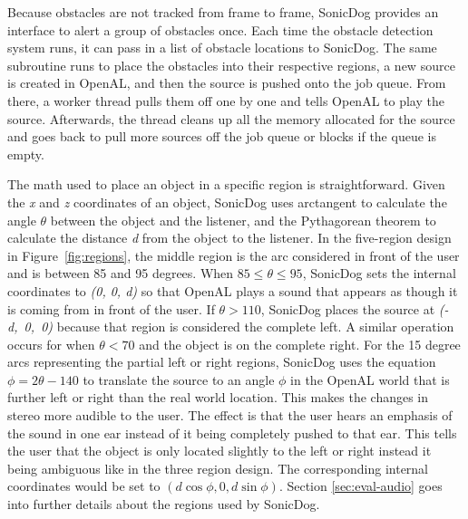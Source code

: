Because obstacles are not tracked from frame to frame, SonicDog provides an
interface to alert a group of obstacles once. Each time the obstacle detection
system runs, it can pass in a list of obstacle locations to SonicDog. The same
subroutine runs to place the obstacles into their respective regions, a new
source is created in OpenAL, and then the source is pushed onto the job queue.
From there, a worker thread pulls them off one by one and tells OpenAL to play
the source. Afterwards, the thread cleans up all the memory allocated for the
source and goes back to pull more sources off the job queue or blocks if the 
queue is empty.

The math used to place an object in a specific region is straightforward. Given
the \emph{x} and \emph{z} coordinates of an object, SonicDog uses arctangent to
calculate the angle \begin{math}\theta\end{math} between the object and the
listener, and the Pythagorean theorem to calculate the distance \emph{d} from
the object to the listener. In the five-region design in Figure~\ref{fig:regions}, the
middle region is the arc considered in front of the user and is between 85 and
95 degrees. When \begin{math}85\leq\theta\leq95\end{math}, SonicDog sets the
internal coordinates to \emph{(0, 0, d)} so that OpenAL plays a sound that
appears as though it is coming from in front of the user. If
\begin{math}\theta>110\end{math}, SonicDog places the source at \emph{(-d,~0,~0)}
because that region is considered the complete left. A similar operation
occurs for when \begin{math}\theta<70\end{math} and the object is on the
complete right. For the 15 degree arcs representing the partial left or right
regions, SonicDog uses the equation \begin{math}\phi=2\theta-140\end{math} to
translate the source to an angle \begin{math}\phi\end{math} in the OpenAL world
that is further left or right than the real world location. This makes the
changes in stereo more audible to the user. The effect is that the user
hears an emphasis of the sound in one ear instead of it being completely pushed
to that ear. This tells the user that the object is only located slightly to the
left or right instead it being ambiguous like in the three region design. The
corresponding internal coordinates would be set to \begin{math}(d\cos\phi, 0,
d\sin\phi)\end{math}. Section \ref{sec:eval-audio} goes into further details
about the regions used by SonicDog.


